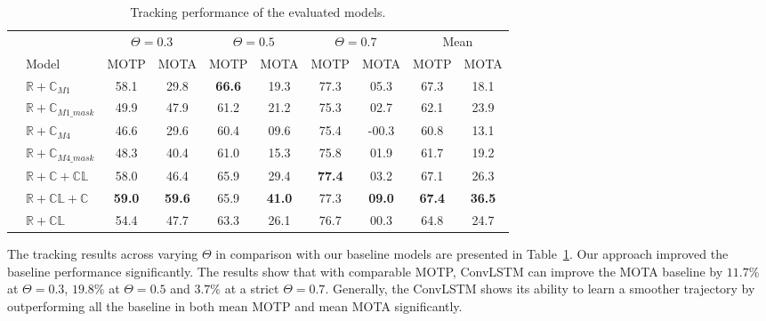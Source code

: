 \documentclass{svjour3}                     \smartqed
\newcommand{\vdir}[1]{\rotatebox[origin=c]{90}{#1}}
\newcommand{\bd}[1]{\textbf{#1}}
\begin{document}
\begin{table}[!htbp]
\caption{Tracking performance of the evaluated models.}
\setlength{\tabcolsep}{0.27em}
\begin{tabular}{c|l|cc|cc|cc||cc}
\rule{0pt}{3ex} \multirow{2}{*}{\makecell[l]{\vdir{}}}&
&\multicolumn{2}{c|}{$\Theta=0.3$} &\multicolumn{2}{c|}{$\Theta=0.5$} &\multicolumn{2}{c||}{$\Theta=0.7$}&\multicolumn{2}{c}{Mean}\\
& Model & {MOTP} & {MOTA} & {MOTP} & {MOTA} & {MOTP} & {MOTA} & {MOTP} & {MOTA} \\ \hline
\rule{0pt}{1ex} \multirow{4}{*}{\makecell[l]{\vdir{Baseline}}}
& $\mathbb{R+C}_{M1}$              &58.1        &29.8        &\bd{66.6}    &19.3        &77.3      &05.3        &67.3        &18.1 \\
& $\mathbb{R+C}_{M1\_mask}$        &49.9        &47.9        &61.2        &21.2        &75.3        &02.7        &62.1        &23.9 \\
& $\mathbb{R+C}_{M4}$              &46.6        &29.6        &60.4        &09.6        &75.4        &-00.3        &60.8        &13.1 \\
& $\mathbb{R+C}_{M4\_mask}$        &48.3        &40.4        &61.0        &15.3        &75.8        &01.9        &61.7        &19.2 \\ \hline
\rule{0pt}{1ex} \multirow{4}{*}{\makecell[l]{\vdir{Ours}}}
& $\mathbb{R+C+CL}$            &58.0    	    &46.4        &65.9        &29.4    &\bd{77.4}        &03.2        &67.1       &26.3 \\
& $\mathbb{R+CL+C}$            &\bd{59.0}       &\bd{59.6}    &65.9        &\bd{41.0}    &77.3       &\bd{09.0}    &\bd{67.4}  &\bd{36.5} \\
& $\mathbb{R+CL}$             &54.4             &47.7        &63.3        &26.1        &76.7        &00.3        &64.8        &24.7 \\
\end{tabular}
\smallskip
\label{tab:tracking}
\end{table}

The tracking results across varying $\Theta$ in comparison with our baseline models are presented in Table~\ref{tab:tracking}.
Our approach improved the baseline performance significantly. The results show that with comparable MOTP, ConvLSTM can improve the MOTA baseline by $11.7\%$ at $\Theta=0.3$, $19.8\%$ at $\Theta=0.5$ and $3.7\%$ at a strict $\Theta=0.7$. Generally, the ConvLSTM shows its ability to learn a smoother trajectory by outperforming all the baseline in both mean MOTP and mean MOTA significantly.
\end{document}
